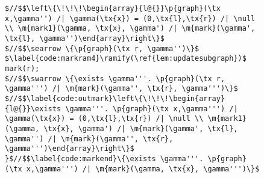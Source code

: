 \documentclass[acmsmall,review,anonymous]{acmart}\settopmatter{printfolios=true,printccs=false,printacmref=false}
\newcommand{\tx}[1]{\text{#1}}
\newcommand{\p}[1]{\ensuremath{\mathsf{#1}}} \newcommand{\m}[1]{\ensuremath{\mathit{#1}}} \newcommand{\ma}[1]{\ensuremath{\mathcal{#1}}} \let\ramify\lightning
\begin{document}
\begin{figure}[t]
\begin{lstlisting}[multicols=2]
$//$$\left\{\!\!\!\begin{array}{l@{}}\p{graph}(\tx x,\gamma'') /| \gamma(\tx{x}) = (0,\tx{l},\tx{r}) /| \null \\ \m{mark1}(\gamma, \tx{x}, \gamma') /| \m{mark}(\gamma', \tx{l}, \gamma'')\end{array}\right\}$
$//$$\searrow \{\p{graph}(\tx r, \gamma'')\}$
$\label{code:markram4}\ramify(\ref{lem:updatesubgraph})$      mark(r);
$//$$\swarrow \{\exists \gamma'''. \p{graph}(\tx r, \gamma''') /| \m{mark}(\gamma'', \tx{r}, \gamma''')\}$
$//$$\label{code:outmark}\left\{\!\!\!\begin{array}{l@{}}\exists \gamma'''. \p{graph}(\tx x,\gamma''') /| \gamma(\tx{x}) = (0,\tx{l},\tx{r}) /| \null \\ \m{mark1}(\gamma, \tx{x}, \gamma') /| \m{mark}(\gamma', \tx{l}, \gamma'') /| \m{mark}(\gamma'', \tx{r}, \gamma''')\end{array}\right\}$
}$//$$\label{code:markend}\{\exists \gamma'''. \p{graph}(\tx x,\gamma''') /| \m{mark}(\gamma, \tx{x}, \gamma''')\}$
\end{lstlisting}


\end{figure}
\end{document}
